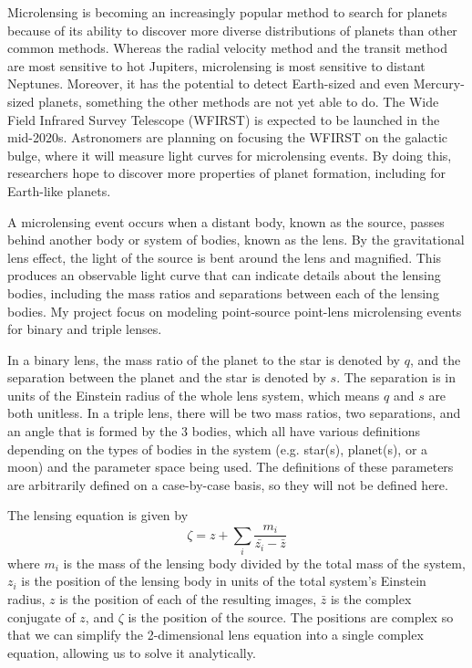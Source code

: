 \documentclass{article}
\begin{document}
Microlensing is becoming an increasingly popular method to search for
planets because of its ability to discover more diverse distributions
of planets than other common methods. Whereas the radial velocity method
and the transit method are most sensitive to hot Jupiters, microlensing
is most sensitive to distant Neptunes. Moreover, it has the potential
to detect Earth-sized and even Mercury-sized planets, something the other
methods are not yet able to do. The Wide Field Infrared Survey Telescope
(WFIRST) is expected to be launched in the mid-2020s. Astronomers are
planning on focusing the WFIRST on the galactic bulge, where it will
measure light curves for microlensing events. By doing this, researchers
hope to discover more properties of planet formation, including for
Earth-like planets.

A microlensing event occurs when a distant body, known as the source,
passes behind another body or system of bodies, known as the lens. By
the gravitational lens effect, the light of the source is bent around
the lens and magnified. This produces an observable light curve that can
indicate details about the lensing bodies, including the mass ratios and
separations between each of the lensing bodies. My project focus on 
modeling point-source point-lens microlensing events for binary and triple
lenses.

In a binary lens, the mass ratio of the planet to the star is denoted by $q$,
and the separation between the planet and the star is denoted by $s$. The
separation is in units of the Einstein radius of the whole lens system, 
which means $q$ and $s$ are both unitless. In a triple lens, there will be two
mass ratios, two separations, and an angle that is formed by the 3 bodies, 
which all have various definitions depending on the types of bodies in the
system (e.g. star(s), planet(s), or a moon) and the parameter space being used.
The definitions of these parameters are arbitrarily defined on a case-by-case
basis, so they will not be defined here.

The lensing equation is given by
\begin{equation}
\zeta = z + \sum_{i} \frac{m_{i}}{\bar{z_{i}} - \bar{z}}
\end{equation}
where ${m_{i}}$ is the mass of the lensing body divided by the total mass
of the system, ${z_{i}}$ is the position of the lensing body in units of the
total system's Einstein radius, $z$ is the position of each of the resulting 
images, $\bar{z}$ is the complex conjugate of $z$, and $\zeta$ is the position
of the source. The positions are complex so that we can simplify the 2-dimensional
lens equation into a single complex equation, allowing us to solve it analytically.
\end{document}
